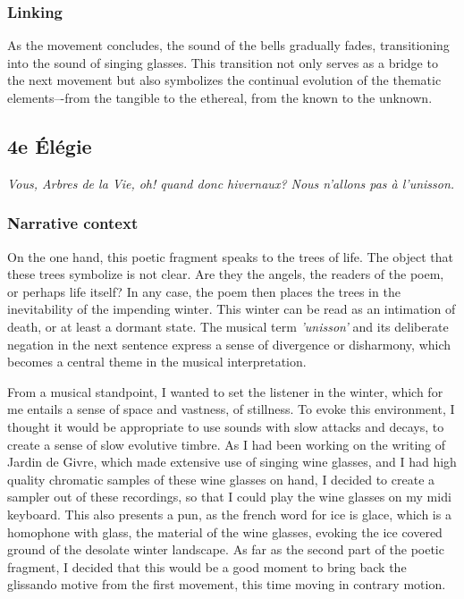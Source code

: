 \documentclass[12pt,twoside,maitrise]{dms}
\theoremstyle{definition}
\begin{document}

\subsubsection{Linking}

As the movement concludes, the sound of the bells gradually fades, transitioning into the sound of singing glasses.
This transition not only serves as a bridge to the next movement but also symbolizes the continual evolution of the thematic elements–-from the tangible to the ethereal, from the known to the unknown.

\subsection{4e Élégie}

\epigraph{\textit{Vous, Arbres de la Vie, oh! quand donc hivernaux? Nous n'allons pas à l'unisson.}}{}

\subsubsection{Narrative context}

On the one hand, this poetic fragment speaks to the trees of life.
The object that these trees symbolize is not clear.
Are they the angels, the readers of the poem, or perhaps life itself?
In any case, the poem then places the trees in the inevitability of the impending winter.
This winter can be read as an intimation of death, or at least a dormant state.
The musical term \textit{'unisson'} and its deliberate negation in the next sentence express a sense of divergence or disharmony, which becomes a central theme in the musical interpretation.

From a musical standpoint, I wanted to set the listener in the winter, which for me entails a sense of space and vastness, of stillness.
To evoke this environment, I thought it would be appropriate to use sounds with slow attacks and decays, to create a sense of slow evolutive timbre.
As I had been working on the writing of Jardin de Givre, which made extensive use of singing wine glasses, and I had high quality chromatic samples of these wine glasses on hand, I decided to create a sampler out of these recordings, so that I could play the wine glasses on my midi keyboard.
This also presents a pun, as the french word for ice is glace, which is a homophone with glass, the material of the wine glasses, evoking the ice covered ground of the desolate winter landscape.
As far as the second part of the poetic fragment, I decided that this would be a good moment to bring back the glissando motive from the first movement, this time moving in contrary motion.
\end{document}
